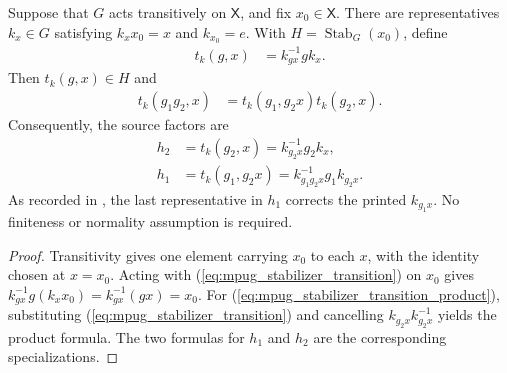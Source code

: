 \begin{lemma}
    \label{thm:mpug_stabilizer_transition}
    \leanok
    Suppose that $G$ acts transitively on $\mathsf X$, and fix
    $x_0\in\mathsf X$. There are representatives $k_x\in G$ satisfying
    $k_xx_0=x$ and $k_{x_0}=e$. With
    $H=\operatorname{Stab}_G(x_0)$, define
    \begin{align}
        t_k(g,x)
         & =k_{g x}^{-1}gk_x.
        \label{eq:mpug_stabilizer_transition}
    \end{align}
    Then $t_k(g,x)\in H$ and
    \begin{align}
        t_k(g_1g_2,x)
         & =t_k(g_1,g_2x)t_k(g_2,x).
        \label{eq:mpug_stabilizer_transition_product}
    \end{align}
    Consequently, the source factors are
    \begin{align}
        h_2
         & =t_k(g_2,x)=k_{g_2x}^{-1}g_2k_x,
        \label{eq:mpug_stabilizer_h2}                  \\
        h_1
         & =t_k(g_1,g_2x)=k_{g_1g_2x}^{-1}g_1k_{g_2x}.
        \label{eq:mpug_stabilizer_h1}
    \end{align}
    As recorded in \cite{gap:fbc25_stabilizer_transition_index_typo}, the last
    representative in $h_1$ corrects the printed $k_{g_1x}$. No finiteness or
    normality assumption is required.
\end{lemma}
\begin{proof}\leanok
    Transitivity gives one element carrying $x_0$ to each $x$, with the
    identity chosen at $x=x_0$. Acting with (\ref{eq:mpug_stabilizer_transition})
    on $x_0$ gives
    $k_{gx}^{-1}g(k_xx_0)=k_{gx}^{-1}(gx)=x_0$.
    For (\ref{eq:mpug_stabilizer_transition_product}), substituting
    (\ref{eq:mpug_stabilizer_transition}) and cancelling
    $k_{g_2x}k_{g_2x}^{-1}$ yields the product formula. The two formulas for
    $h_1$ and $h_2$ are the corresponding specializations.
\end{proof}


